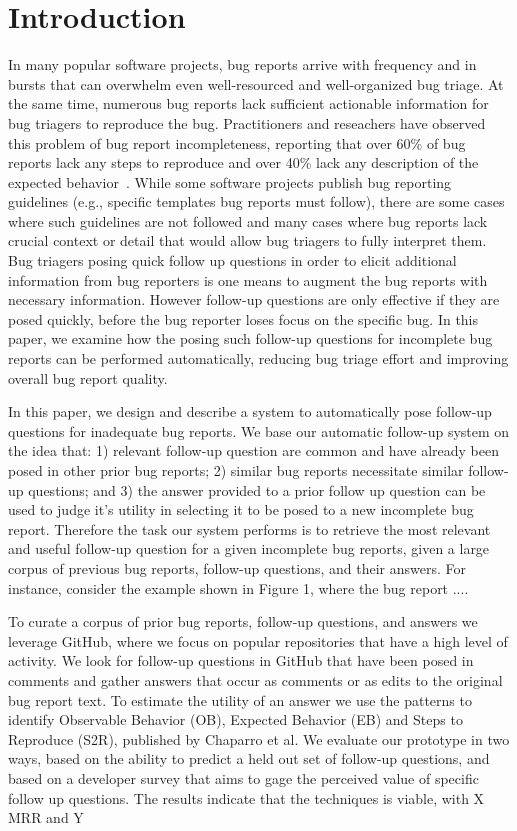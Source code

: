 \section{Introduction}

In many popular software projects, bug reports arrive with frequency and in bursts that can overwhelm even well-resourced and well-organized bug triage. At the same time, numerous bug reports lack sufficient actionable information for bug triagers to reproduce the bug. Practitioners and reseachers have observed this problem of bug report incompleteness, reporting that over 60\% of bug reports lack any steps to reproduce and over 40\% lack any description of the expected behavior~\cite{chaparro17detecting}. While some software projects publish bug reporting guidelines (e.g., specific templates bug reports must follow), there are some cases where such guidelines are not followed and many cases where bug reports lack crucial context or detail that would allow bug triagers to fully interpret them. Bug triagers posing quick follow up questions in order to elicit additional information from bug reporters is one means to augment the bug reports with necessary information. However follow-up questions are only effective if they are posed quickly, before the bug reporter loses focus on the specific bug. In this paper, we examine how the posing such follow-up questions for incomplete bug reports can be performed automatically, reducing bug triage effort and improving overall bug report quality.

In this paper, we design and describe a system to automatically pose follow-up questions for inadequate bug reports. We base our automatic follow-up system on the idea that: 1) relevant follow-up question are common and have already been posed in other prior bug reports; 2) similar bug reports necessitate similar follow-up questions; and 3) the answer provided to a prior follow up question can be used to judge it's utility in selecting it to be posed to a new incomplete bug report. Therefore the task our system performs is to retrieve the most relevant and useful follow-up question for a given incomplete bug reports, given a large corpus of previous bug reports, follow-up questions, and their answers.
For instance, consider the example shown in Figure 1, where the bug report ....

To curate a corpus of prior bug reports, follow-up questions, and answers we leverage GitHub, where we focus on popular repositories that have a high level of activity. We look for follow-up questions in GitHub that have been posed in comments and gather answers that occur as comments or as edits to the original bug report text. To estimate the utility of an answer we use the patterns to identify Observable Behavior (OB), Expected Behavior (EB) and Steps to Reproduce (S2R), published by Chaparro et al. We evaluate our prototype in two ways, based on the ability to predict a held out set of follow-up questions, and based on a developer survey that aims to gage the perceived value of specific follow up questions. The results indicate that the techniques is viable, with X MRR and Y%
